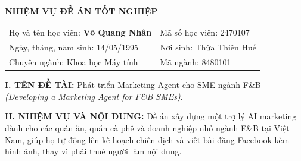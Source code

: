 \cleardoublepage
\thispagestyle{empty}

\noindent{}

\vspace{1.2cm}
\begin{center}
    \fontsize{17}{20}\selectfont\textbf{NHIỆM VỤ ĐỀ ÁN TỐT NGHIỆP}
\end{center}

\vspace{1cm}
\noindent
\begin{tabular}{@{}p{}p{}@{}}
Họ và tên học viên: \textbf{Võ Quang Nhân} & Mã số học viên: 2470107 \\[0.35cm]
Ngày, tháng, năm sinh: 14/05/1995 & Nơi sinh: Thừa Thiên Huế \\[0.35cm]
Chuyên ngành: Khoa học Máy tính & Mã ngành: 8480101 \\
\end{tabular}

\vspace{0.8cm}
\noindent\textbf{I. TÊN ĐỀ TÀI:} Phát triển Marketing Agent cho SME ngành F\&B \textit{(Developing a Marketing Agent for F\&B SMEs)}.

\vspace{0.5cm}
\noindent\textbf{II. NHIỆM VỤ VÀ NỘI DUNG:} Đề án xây dựng một trợ lý AI marketing dành cho các quán ăn, quán cà phê và doanh nghiệp nhỏ ngành F\&B tại Việt Nam, giúp họ tự động lên kế hoạch chiến dịch và viết bài đăng Facebook kèm hình ảnh, thay vì phải thuê người làm nội dung.


